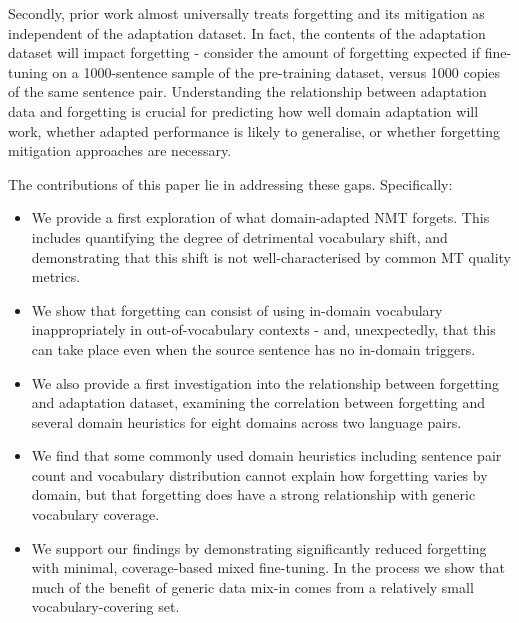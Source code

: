 \documentclass[11pt]{article}
\begin{document}
Secondly, prior work almost universally treats forgetting and its mitigation as independent of the adaptation dataset.  In fact, the contents of the adaptation dataset will impact forgetting - consider the amount of forgetting expected if fine-tuning on a 1000-sentence sample of the pre-training dataset, versus 1000 copies of the same sentence pair. Understanding the relationship between adaptation data and forgetting is crucial for predicting how well domain adaptation will work, whether adapted performance is likely to generalise, or whether forgetting mitigation approaches are necessary. 


The contributions of this paper lie in addressing these gaps. Specifically:
\begin{itemize}
    \item We provide a first exploration of what domain-adapted NMT forgets. This includes quantifying the degree of detrimental vocabulary shift, and demonstrating that this shift is not well-characterised by common MT quality metrics.
    \item We show that forgetting can consist of using in-domain vocabulary inappropriately in out-of-vocabulary contexts - and, unexpectedly, that this can take place even when the source sentence has no in-domain triggers.
    \item We also provide a first investigation into the relationship between forgetting and adaptation dataset, examining the correlation between forgetting and several domain heuristics for eight domains across two language pairs.
    \item We find that some commonly used domain heuristics including sentence pair count and vocabulary distribution cannot explain how forgetting varies by domain, but that forgetting does have a strong relationship with generic vocabulary coverage.
    \item  We support our findings by demonstrating significantly reduced forgetting with minimal, coverage-based mixed fine-tuning. In the process we show that much of the benefit of generic data mix-in comes from a relatively small vocabulary-covering set.
\end{itemize}

\end{document}
